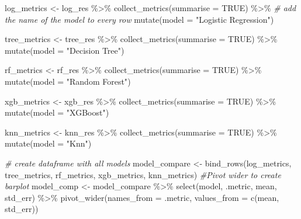 \documentclass[
]{article}
\newenvironment{Shaded}{\begin{snugshade}}{\end{snugshade}}
\newcommand{\AttributeTok}[1]{\textcolor[rgb]{0.77,0.63,0.00}{#1}}
\newcommand{\CommentTok}[1]{\textcolor[rgb]{0.56,0.35,0.01}{\textit{#1}}}
\newcommand{\ConstantTok}[1]{\textcolor[rgb]{0.00,0.00,0.00}{#1}}
\newcommand{\FunctionTok}[1]{\textcolor[rgb]{0.00,0.00,0.00}{#1}}
\newcommand{\NormalTok}[1]{#1}
\newcommand{\OtherTok}[1]{\textcolor[rgb]{0.56,0.35,0.01}{#1}}
\newcommand{\SpecialCharTok}[1]{\textcolor[rgb]{0.00,0.00,0.00}{#1}}
\newcommand{\StringTok}[1]{\textcolor[rgb]{0.31,0.60,0.02}{#1}}
\begin{document}
\begin{Shaded}
\begin{Highlighting}[]
\NormalTok{log\_metrics }\OtherTok{\textless{}{-}} 
\NormalTok{  log\_res }\SpecialCharTok{\%\textgreater{}\%} 
  \FunctionTok{collect\_metrics}\NormalTok{(}\AttributeTok{summarise =} \ConstantTok{TRUE}\NormalTok{) }\SpecialCharTok{\%\textgreater{}\%}
  \CommentTok{\# add the name of the model to every row}
  \FunctionTok{mutate}\NormalTok{(}\AttributeTok{model =} \StringTok{"Logistic Regression"}\NormalTok{) }

\NormalTok{tree\_metrics }\OtherTok{\textless{}{-}} 
\NormalTok{  tree\_res }\SpecialCharTok{\%\textgreater{}\%} 
  \FunctionTok{collect\_metrics}\NormalTok{(}\AttributeTok{summarise =} \ConstantTok{TRUE}\NormalTok{) }\SpecialCharTok{\%\textgreater{}\%}
  \FunctionTok{mutate}\NormalTok{(}\AttributeTok{model =} \StringTok{"Decision Tree"}\NormalTok{)}

\NormalTok{rf\_metrics }\OtherTok{\textless{}{-}} 
\NormalTok{  rf\_res }\SpecialCharTok{\%\textgreater{}\%} 
  \FunctionTok{collect\_metrics}\NormalTok{(}\AttributeTok{summarise =} \ConstantTok{TRUE}\NormalTok{) }\SpecialCharTok{\%\textgreater{}\%}
  \FunctionTok{mutate}\NormalTok{(}\AttributeTok{model =} \StringTok{"Random Forest"}\NormalTok{)}

\NormalTok{xgb\_metrics }\OtherTok{\textless{}{-}} 
\NormalTok{  xgb\_res }\SpecialCharTok{\%\textgreater{}\%} 
  \FunctionTok{collect\_metrics}\NormalTok{(}\AttributeTok{summarise =} \ConstantTok{TRUE}\NormalTok{) }\SpecialCharTok{\%\textgreater{}\%}
  \FunctionTok{mutate}\NormalTok{(}\AttributeTok{model =} \StringTok{"XGBoost"}\NormalTok{)}

\NormalTok{knn\_metrics }\OtherTok{\textless{}{-}} 
\NormalTok{  knn\_res }\SpecialCharTok{\%\textgreater{}\%} 
  \FunctionTok{collect\_metrics}\NormalTok{(}\AttributeTok{summarise =} \ConstantTok{TRUE}\NormalTok{) }\SpecialCharTok{\%\textgreater{}\%}
  \FunctionTok{mutate}\NormalTok{(}\AttributeTok{model =} \StringTok{"Knn"}\NormalTok{)}

\CommentTok{\# create dataframe with all models}
\NormalTok{model\_compare }\OtherTok{\textless{}{-}} \FunctionTok{bind\_rows}\NormalTok{(log\_metrics,}
\NormalTok{                           tree\_metrics,}
\NormalTok{                           rf\_metrics,}
\NormalTok{                           xgb\_metrics,}
\NormalTok{                           knn\_metrics)}
\CommentTok{\#Pivot wider to create barplot}
\NormalTok{  model\_comp }\OtherTok{\textless{}{-}}\NormalTok{ model\_compare }\SpecialCharTok{\%\textgreater{}\%} 
  \FunctionTok{select}\NormalTok{(model, .metric, mean, std\_err) }\SpecialCharTok{\%\textgreater{}\%} 
  \FunctionTok{pivot\_wider}\NormalTok{(}\AttributeTok{names\_from =}\NormalTok{ .metric, }\AttributeTok{values\_from =} \FunctionTok{c}\NormalTok{(mean, std\_err)) }


\end{Highlighting}
\end{Shaded}
\end{document}
